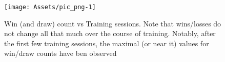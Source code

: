 \begin{figure}[b]
	\centering
	\texttt{[image: Assets/pic\_png-1]}
	\caption{Win (and draw) count vs Training sessions.  Note that wins/losses do not change all that much over the course of training.
    Notably, after the first few training sessions, the maximal (or near it) values for win/draw counts have ben observed}
	\label{fig:WinsvTraining}
\end{figure}